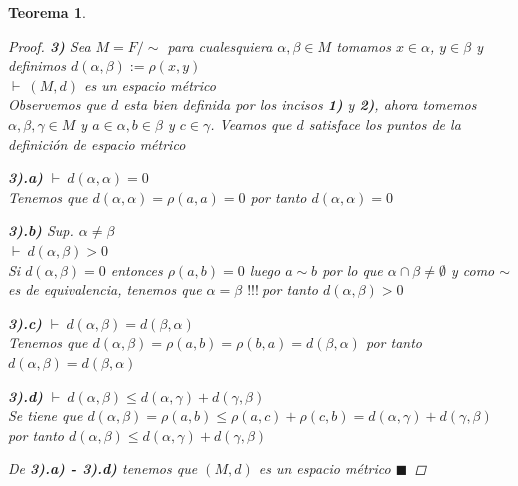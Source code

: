 \documentclass[oneside]{book} %
\theoremstyle{Teorema}
\newtheorem{Teorema}[Definicion]{Teorema}
\theoremstyle{Ejemplos}
\theoremstyle{[Obs]}
\renewcommand{\{}{\left\lbrace} %
\renewcommand{\}}{\right\rbrace} %
\newcommand{\n}{\cap} %
\renewcommand{\qed}{$\blacksquare$} %
\newcommand{\pd}{$\vdash\ $} %
\renewcommand{\c}{$!!!\ $} %
\newcommand{\indentar}[2]{{\setlength{\leftskip}{#1} #2 \setlength{\leftskip}{0cm}}} %
\begin{document}
\begin{Teorema}
\begin{proof}
					\textbf{3)} Sea $M = F/\sim$ para cualesquiera $\alpha, \beta \in M$ tomamos $x \in \alpha$, $y \in \beta$ y definimos $d(\alpha, \beta) := \rho(x, y)$ \\
					\pd $(M, d)$ es un espacio métrico \\
					Observemos que $d$ esta bien definida por los incisos \textbf{1)} y \textbf{2)}, ahora tomemos $\alpha, \beta, \gamma \in M$ y $a \in \alpha, b \in \beta$ y $c \in \gamma$. Veamos que $d$ satisface los puntos de la definición de espacio métrico

					\indentar{1cm}{

						\textbf{3).a)} \pd $d(\alpha, \alpha) = 0$ \\
						Tenemos que $d(\alpha, \alpha) = \rho(a, a) = 0$ por tanto $d(\alpha, \alpha) = 0$

						\textbf{3).b)} Sup. $\alpha \neq \beta$ \\
						\pd $d(\alpha, \beta) > 0$ \\
						Si $d(\alpha, \beta) = 0$ entonces $\rho(a, b) = 0$ luego $a \sim b$ por lo que $\alpha \n \beta \neq \emptyset$ y como $\sim$ es de equivalencia, tenemos que $\alpha = \beta$ \c por tanto $d(\alpha, \beta) > 0$

						\textbf{3).c)} \pd $d(\alpha, \beta) = d(\beta, \alpha)$ \\
						Tenemos que $d(\alpha, \beta) = \rho(a, b) = \rho(b, a) = d(\beta, \alpha)$ por tanto  $d(\alpha, \beta) = d(\beta, \alpha)$
						
						\textbf{3).d)} \pd $d(\alpha, \beta) \leq d(\alpha, \gamma) + d(\gamma, \beta)$ \\
						Se tiene que $d(\alpha, \beta) = \rho(a, b) \leq \rho(a, c) + \rho(c, b) = d(\alpha, \gamma) + d(\gamma, \beta)$ por tanto $d(\alpha, \beta) \leq d(\alpha, \gamma) + d(\gamma, \beta)$

					}

					De \textbf{3).a) - 3).d)} tenemos que $(M, d)$ es un espacio métrico \qed

				\end{proof}

			\end{Teorema}
\end{document}
